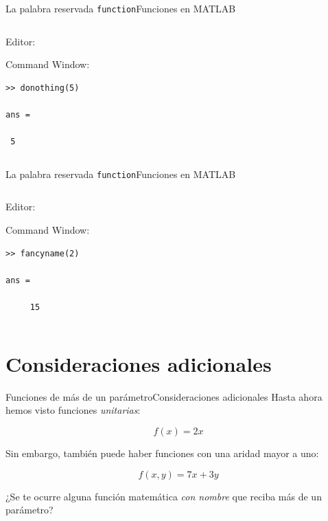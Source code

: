 \documentclass[spanish, c, handout]{beamer}
\newcommand{\matlab}[1]{\lstinline[style=Matlab-editor]!#1!}
\begin{document}
\begin{frame}[fragile]{La palabra reservada \matlab{function}}{Funciones en MATLAB}
    \begin{columns}
        \begin{column}{0.95\linewidth}
            Editor:
            \bigskip
            

            \bigskip
            
            Command Window:
            \bigskip
\begin{lstlisting}[style=output]
>> donothing(5)

ans =

 5
\end{lstlisting}
        \end{column}
    \end{columns}
\end{frame}

               
\begin{frame}[fragile]{La palabra reservada \matlab{function}}{Funciones en MATLAB}
    \begin{columns}
        \begin{column}{0.95\linewidth}
            Editor:
            \bigskip
            

            \bigskip
            
            Command Window:
            \bigskip
\begin{lstlisting}[style=output]
>> fancyname(2)

ans =

     15
\end{lstlisting} 
        \end{column}
        
    \end{columns}
\end{frame}

\section{Consideraciones adicionales}

\begin{frame}{Funciones de más de un parámetro}{Consideraciones adicionales}
    Hasta ahora hemos visto funciones \textit{unitarias}:

    $$f(x) = 2x$$ \pause

    Sin embargo, también puede haber funciones con una \alert{aridad} mayor a uno:

    $$f(x, y) = 7x + 3y$$ \pause

    ¿Se te ocurre alguna función matemática \textit{con nombre} que reciba más de un parámetro?

\end{frame}
\end{document}
